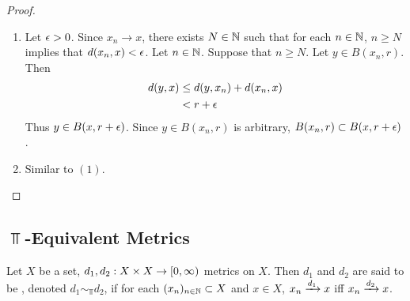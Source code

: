 \documentclass{book}
\begin{document}
\begin{proof}
	\begin{enumerate}
		\item Let $\epsilon >0$. Since $x_n \rightarrow x$, there exists $N \in \mathbb{N}$ such that for each $n \in \mathbb{N}$, $n \geq N$ implies that $d(x_n, x) < \epsilon$. Let $n \in \mathbb{N}$. Suppose that $n \geq N$. Let $y \in B(x_n, r)$. Then 
		\begin{align*}
			d(y, x)
			& \leq d(y, x_n) + d(x_n, x) \\
			& < r + \epsilon \\
		\end{align*}
		Thus $y \in B(x, r+ \epsilon)$. Since $y \in B(x_n, r)$ is arbitrary, $B(x_n, r) \subset  B(x, r+ \epsilon)$.
		\item Similar to $(1)$. 
	\end{enumerate}
\end{proof}















































\newpage

\subsection{$\Top$-Equivalent Metrics}

\begin{defn} \ld{}
	Let $X$ be a set, $d_1, d_2: X \times X \rightarrow [0,\infty)$ metrics on $X$. Then $d_1$ and $d_2$ are said to be  , denoted $d_1 \sim_{\Top} d_2$, if for each $(x_n)_{n \in \mathbb{N}} \subset X$ and $x \in X$, $x_n \xrightarrow{d_1} x$ iff $x_n \xrightarrow{d_2} x$.	
\end{defn}	
\end{document}

